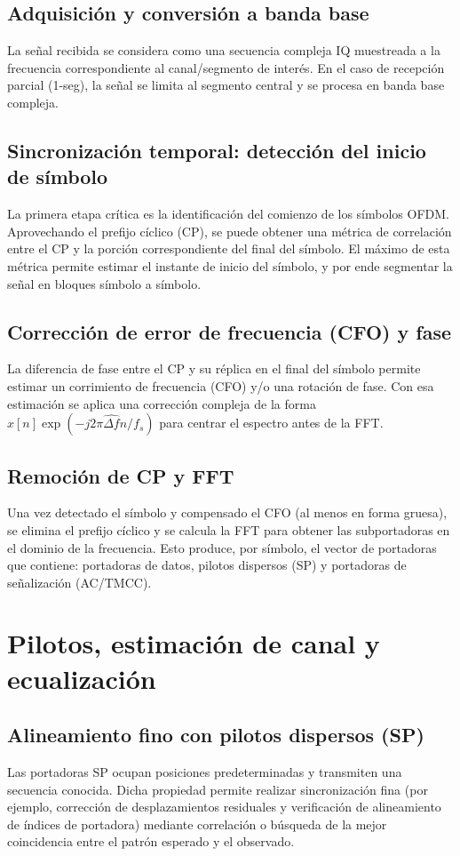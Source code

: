 \subsection{Adquisición y conversión a banda base}
La señal recibida se considera como una secuencia compleja IQ muestreada a la frecuencia
correspondiente al canal/segmento de interés. En el caso de recepción parcial (1-seg),
la señal se limita al segmento central y se procesa en banda base compleja.

\subsection{Sincronización temporal: detección del inicio de símbolo}
La primera etapa crítica es la identificación del comienzo de los símbolos OFDM.
Aprovechando el prefijo cíclico (CP), se puede obtener una métrica de correlación entre
el CP y la porción correspondiente del final del símbolo. El máximo de esta métrica
permite estimar el instante de inicio del símbolo, y por ende segmentar la señal en
bloques símbolo a símbolo.

\subsection{Corrección de error de frecuencia (CFO) y fase}
La diferencia de fase entre el CP y su réplica en el final del símbolo permite estimar
un corrimiento de frecuencia (CFO) y/o una rotación de fase. Con esa estimación se aplica
una corrección compleja de la forma $x[n]\exp(-j2\pi \widehat{\Delta f} n / f_s)$
para centrar el espectro antes de la FFT.

\subsection{Remoción de CP y FFT}
Una vez detectado el símbolo y compensado el CFO (al menos en forma gruesa),
se elimina el prefijo cíclico y se calcula la FFT para obtener las subportadoras en el
dominio de la frecuencia. Esto produce, por símbolo, el vector de portadoras que contiene:
portadoras de datos, pilotos dispersos (SP) y portadoras de señalización (AC/TMCC).

\section{Pilotos, estimación de canal y ecualización}
\label{sec:rx_channel_est}

\subsection{Alineamiento fino con pilotos dispersos (SP)}
Las portadoras SP ocupan posiciones predeterminadas y transmiten una secuencia conocida.
Dicha propiedad permite realizar sincronización fina (por ejemplo, corrección de
desplazamientos residuales y verificación de alineamiento de índices de portadora)
mediante correlación o búsqueda de la mejor coincidencia entre el patrón esperado y el
observado.

